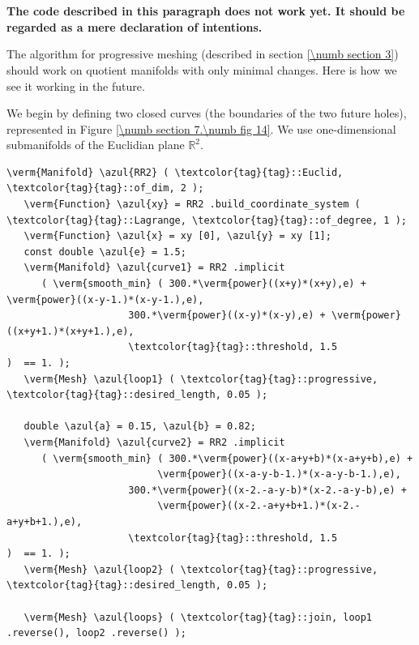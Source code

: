 \section{~~}
\label{\numb section 7.\numb parag 19}

{\normalfont\bfseries The code described in this paragraph does not work yet.
It should be regarded as a mere declaration of intentions.}
\medskip
{}

The algorithm for progressive meshing (described in section \ref{\numb section 3})
should work on quotient manifolds with only minimal changes.
Here is how we see it working in the future.

We begin by defining two closed curves (the boundaries of the two future holes),
represented in Figure \ref{\numb section 7.\numb fig 14}.
We use one-dimensional submanifolds of the Euclidian plane $ \mathbb{R}^2 $.

\begin{Verbatim}[commandchars=\\\{\},formatcom=\small\tt,frame=single,
   rulecolor=\color{coment},baselinestretch=0.94,framesep=2mm         ]
   \verm{Manifold} \azul{RR2} ( \textcolor{tag}{tag}::Euclid, \textcolor{tag}{tag}::of_dim, 2 );
   \verm{Function} \azul{xy} = RR2 .build_coordinate_system ( \textcolor{tag}{tag}::Lagrange, \textcolor{tag}{tag}::of_degree, 1 );
   \verm{Function} \azul{x} = xy [0], \azul{y} = xy [1];
   const double \azul{e} = 1.5;
   \verm{Manifold} \azul{curve1} = RR2 .implicit 
      ( \verm{smooth_min} ( 300.*\verm{power}((x+y)*(x+y),e) + \verm{power}((x-y-1.)*(x-y-1.),e),
                     300.*\verm{power}((x-y)*(x-y),e) + \verm{power}((x+y+1.)*(x+y+1.),e),
                     \textcolor{tag}{tag}::threshold, 1.5                     )  == 1. );
   \verm{Mesh} \azul{loop1} ( \textcolor{tag}{tag}::progressive, \textcolor{tag}{tag}::desired_length, 0.05 );
      
   double \azul{a} = 0.15, \azul{b} = 0.82;
   \verm{Manifold} \azul{curve2} = RR2 .implicit 
      ( \verm{smooth_min} ( 300.*\verm{power}((x-a+y+b)*(x-a+y+b),e) +
                          \verm{power}((x-a-y-b-1.)*(x-a-y-b-1.),e),
                     300.*\verm{power}((x-2.-a-y-b)*(x-2.-a-y-b),e) +
                          \verm{power}((x-2.-a+y+b+1.)*(x-2.-a+y+b+1.),e),
                     \textcolor{tag}{tag}::threshold, 1.5                           )  == 1. );
   \verm{Mesh} \azul{loop2} ( \textcolor{tag}{tag}::progressive, \textcolor{tag}{tag}::desired_length, 0.05 );

   \verm{Mesh} \azul{loops} ( \textcolor{tag}{tag}::join, loop1 .reverse(), loop2 .reverse() );                     
\end{Verbatim}

